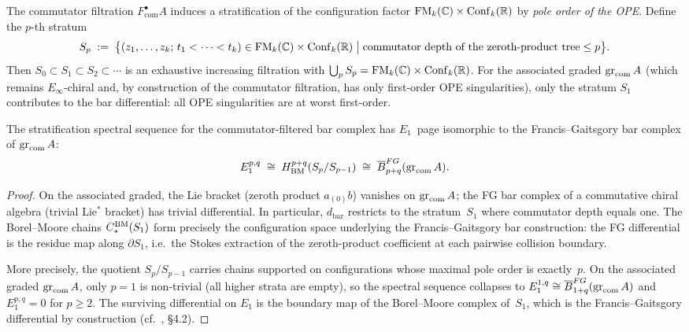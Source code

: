 \begin{construction}
\label{constr:commutator-stratification}
The commutator filtration $F_{\mathrm{com}}^\bullet A$ induces a stratification
of the configuration factor $\mathrm{FM}_k(\mathbb{C})\times\mathrm{Conf}_k(\mathbb{R})$ by
\emph{pole order of the OPE}. Define the $p$-th stratum
\[
S_p
\;:=\;
\bigl\{
(z_1,\dotsc,z_k;\,t_1<\cdots<t_k)
\in \mathrm{FM}_k(\mathbb{C})\times\mathrm{Conf}_k(\mathbb{R})
\;\big|\;
\text{commutator depth of the zeroth-product tree} \le p
\bigr\}.
\]
Then $S_0\subset S_1\subset S_2\subset\cdots$ is an exhaustive increasing
filtration with $\bigcup_p S_p = \mathrm{FM}_k(\mathbb{C})\times\mathrm{Conf}_k(\mathbb{R})$.
For the associated graded $\operatorname{gr}_{\mathrm{com}}A$ (which remains
$E_\infty$-chiral and, by construction of the commutator filtration,
has only first-order OPE singularities), only the stratum $S_1$ contributes to the bar
differential: all OPE singularities are at worst first-order.
\end{construction}

\begin{proposition}[\ClaimStatusProvedHere]
\label{prop:stratification-E1}
The stratification spectral sequence for the commutator-filtered bar complex
has $E_1$~page isomorphic to the Francis--Gaitsgory bar complex of
$\operatorname{gr}_{\mathrm{com}}A$:
\[
E_1^{p,q}
\;\cong\;
H^{p+q}_{\mathrm{BM}}(S_p/S_{p-1})
\;\cong\;
\overline{B}^{FG}_{p+q}(\operatorname{gr}_{\mathrm{com}}A).
\]
\end{proposition}

\begin{proof}
On the associated graded, the Lie bracket (zeroth product $a_{(0)}b$)
vanishes on $\operatorname{gr}_{\mathrm{com}}A$; the FG bar complex of a commutative
chiral algebra (trivial Lie$^*$ bracket) has trivial differential.
In particular, $d_{\mathrm{bar}}$ restricts to the
stratum~$S_1$ where commutator depth equals one.
The Borel--Moore chains $C_*^{\mathrm{BM}}(S_1)$ form precisely the
configuration space underlying the Francis--Gaitsgory bar construction:
the FG differential is the residue map along $\partial S_1$, i.e.\ the
Stokes extraction of the zeroth-product coefficient at each pairwise
collision boundary.

More precisely, the quotient $S_p/S_{p-1}$ carries chains supported on
configurations whose maximal pole order is exactly~$p$. On the associated
graded $\operatorname{gr}_{\mathrm{com}}A$, only $p=1$ is non-trivial (all higher strata
are empty), so the spectral sequence collapses to
$E_1^{1,q}\cong\overline{B}^{FG}_{1+q}(\operatorname{gr}_{\mathrm{com}}A)$
and $E_1^{p,q}=0$ for $p\ge 2$. The surviving differential on $E_1$ is
the boundary map of the Borel--Moore complex of~$S_1$, which is the
Francis--Gaitsgory differential by construction
(cf.\ \cite{francis-gaitsgory}, \S4.2).
\end{proof}

